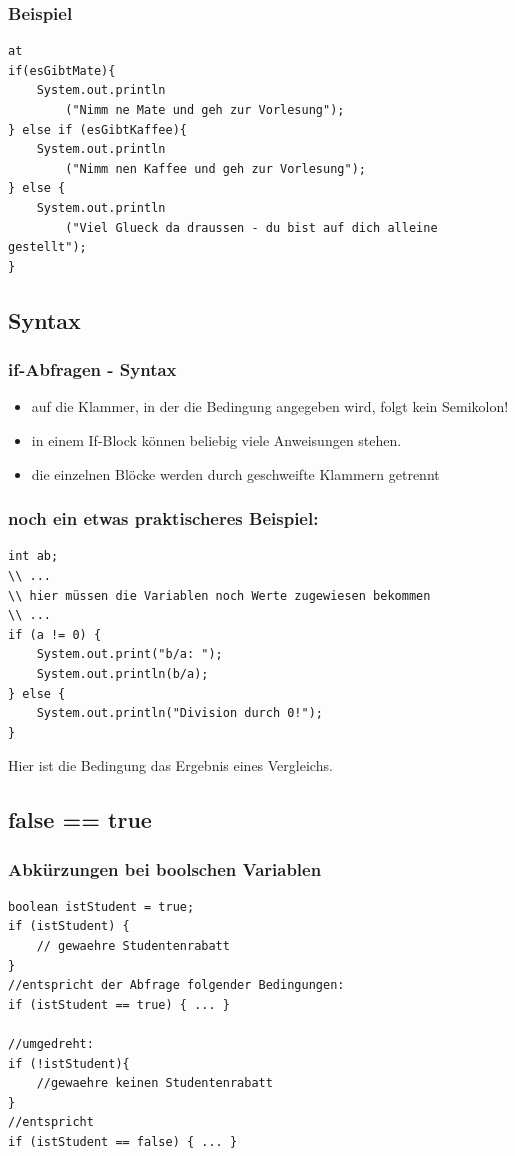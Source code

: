 \documentclass[final]{beamer}
\begin{document}
\begin{frame}[containsverbatim]
	\frametitle{Beispiel}
	\begin{lstlisting}at
if(esGibtMate){
	System.out.println
		("Nimm ne Mate und geh zur Vorlesung");
} else if (esGibtKaffee){
	System.out.println
		("Nimm nen Kaffee und geh zur Vorlesung");
} else {
	System.out.println
		("Viel Glueck da draussen - du bist auf dich alleine gestellt");
}
	\end{lstlisting}
\end{frame}

\subsection{Syntax}
\begin{frame}
	\frametitle{if-Abfragen - Syntax}
	\begin{itemize}
		\item{auf die Klammer, in der die Bedingung angegeben wird, folgt kein Semikolon!}
		\item{in einem If-Block können beliebig viele Anweisungen stehen.}
		\item{die einzelnen Blöcke werden durch geschweifte Klammern getrennt}
	\end{itemize}
\end{frame}

\begin{frame}[containsverbatim]
	\frametitle{noch ein etwas praktischeres Beispiel:}
	\begin{lstlisting}
int ab;
\\ ...
\\ hier müssen die Variablen noch Werte zugewiesen bekommen
\\ ...
if (a != 0) {
	System.out.print("b/a: ");
	System.out.println(b/a);
} else {
	System.out.println("Division durch 0!");
}
	\end{lstlisting}
	Hier ist die Bedingung das Ergebnis eines Vergleichs.
\end{frame}

\subsection{false == true}
\begin{frame}[containsverbatim]
	\frametitle{Abkürzungen bei boolschen Variablen}
	\begin{lstlisting}
boolean istStudent = true;
if (istStudent) {
	// gewaehre Studentenrabatt
}
//entspricht der Abfrage folgender Bedingungen:
if (istStudent == true) { ... }

//umgedreht:
if (!istStudent){
	//gewaehre keinen Studentenrabatt
}
//entspricht
if (istStudent == false) { ... }
	\end{lstlisting}
\end{frame}
\end{document}
